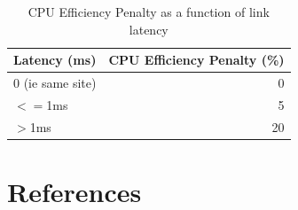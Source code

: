 \documentclass[a4paper]{jpconf}
\begin{document}
\begin{table}
  \begin{center}
    \begin{tabular}{|l|r|}
      \hline
      Latency (ms) & CPU Efficiency Penalty (\%) \\
      \hline
      0 (ie same site) & 0 \\
      $<=$1ms & 5 \\
      $>$1ms & 20 \\
      \hline
    \end{tabular}
    \caption{CPU Efficiency Penalty as a function of link latency\label{tab:cpuHIT}}
  \end{center}
\end{table}


\section*{References}
\end{document}
